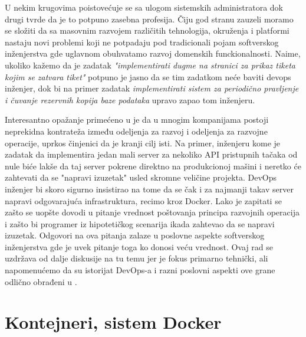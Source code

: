 \documentclass[12pt,oneside]{memoir}
\begin{document}
U nekim krugovima poistovećuje se sa ulogom sistemskih administratora dok drugi tvrde da je to potpuno zasebna profesija. Čiju god stranu zauzeli moramo se složiti da sa masovnim razvojem različitih tehnologija, okruženja i platformi nastaju novi problemi koji ne potpadaju pod tradicionali pojam softverskog inženjerstva gde uglavnom obuhvatamo razvoj domenskih funckionalnosti. Naime, ukoliko kažemo da je zadatak \textit{"implementirati dugme na stranici za prikaz tiketa kojim se zatvara tiket"} potpuno je jasno da se tim zadatkom neće baviti devops inženjer, dok bi na primer zadatak \textit{implementirati sistem za periodično pravljenje i čuvanje rezervnih kopija baze podataka} upravo zapao tom inženjeru.

Interesantno opažanje primećeno u \cite{devopshandbook} je da u mnogim kompanijama postoji neprekidna kontrateža između odeljenja za razvoj i odeljenja za razvojne operacije, uprkos činjenici da je kranji cilj isti. Na primer, inženjeru kome je zadatak da implementira jedan mali server za nekoliko API pristupnih tačaka od nule biće lakše da taj server pokrene direktno na produkcionoj mašini i neretko će zahtevati da se "napravi izuzetak" usled skromne veličine projekta. DevOps inženjer bi skoro sigurno insistirao na tome da se čak i za najmanji takav server napravi odgovarajuća infrastruktura, recimo kroz Docker. Lako je zapitati se zašto se uopšte dovodi u pitanje vrednost poštovanja principa razvojnih operacija i zašto bi programer iz hipotetičkog scenarija ikada zahtevao da se napravi izuzetak. Odgovori na ova pitanja zalaze u poslovne aspekte softverskog inženjerstva gde je uvek pitanje toga ko donosi veću vrednost. Ovaj rad se uzdržava od dalje diskusije na tu temu jer je fokus primarno tehnički, ali napomenućemo da su istorijat DevOps-a i razni poslovni aspekti ove grane odlično obrađeni u \cite{devopshandbook}.


\section{Kontejneri, sistem Docker}
\end{document}
